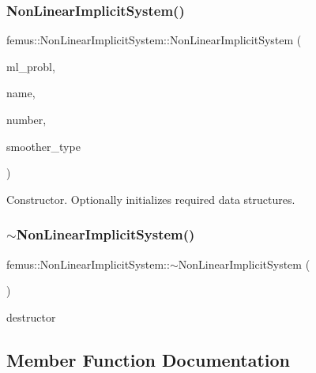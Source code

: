 \subsubsection{\texorpdfstring{Non\+Linear\+Implicit\+System()}{NonLinearImplicitSystem()}}
{\footnotesize\ttfamily femus\+::\+Non\+Linear\+Implicit\+System\+::\+Non\+Linear\+Implicit\+System (\begin{DoxyParamCaption}\item[{\mbox{\hyperlink{classfemus_1_1_multi_level_problem}{Multi\+Level\+Problem}} \&}]{ml\+\_\+probl,  }\item[{const std\+::string \&}]{name,  }\item[{const unsigned int}]{number,  }\item[{const \mbox{\hyperlink{_mg_smoother_enum_8hpp_a4d11c2ff93e2f0f440c879a9c40cda71}{Mg\+Smoother}} \&}]{smoother\+\_\+type }\end{DoxyParamCaption})}

Constructor. Optionally initializes required data structures. \mbox{\label{classfemus_1_1_non_linear_implicit_system_ac12060f51db75a9bd7866982ec5dd284}} 
\subsubsection{\texorpdfstring{$\sim$\+Non\+Linear\+Implicit\+System()}{~NonLinearImplicitSystem()}}
{\footnotesize\ttfamily femus\+::\+Non\+Linear\+Implicit\+System\+::$\sim$\+Non\+Linear\+Implicit\+System (\begin{DoxyParamCaption}{ }\end{DoxyParamCaption})\hspace{0.3cm}{\ttfamily [virtual]}}

destructor 

\subsection{Member Function Documentation}
\mbox{\label{classfemus_1_1_non_linear_implicit_system_afc52f569e5be8c3bf593a00c883d7192}} 
